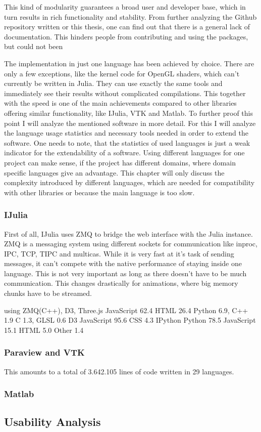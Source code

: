 This kind of modularity guarantees a broad user and developer base, which in turn results in rich functionality and stability.
From further analyzing the Github repository written or this thesis, one can find out that there is a general lack of documentation.
This hinders people from contributing and using the packages, but could not been 

The implementation in just one language has been achieved by choice. There are only a few exceptions, like the kernel code for OpenGL shaders, which can't currently be written in Julia. 
They can use exactly the same tools and immediately see their results without complicated compilations.
This together with the speed is one of the main achievements compared to other libraries offering similar functionality, like IJulia, VTK and Matlab.
To further proof this point I will analyze the mentioned software in more detail.
For this I will analyze the language usage statistics and necessary tools needed in order to extend the software.
One needs to note, that the statistics of used languages is just a weak indicator for the extendability of a software.
Using different languages for one project can make sense, if the project has different domains, where domain specific languages give an advantage.
This chapter will only discuss the complexity introduced by different languages, which are needed for compatibility with other libraries or because the main language is too slow.

\subsubsection{IJulia}
First of all, IJulia uses ZMQ to bridge the web interface with the Julia instance.
ZMQ is a messaging system using different sockets for communication like inproc, IPC, TCP, TIPC and multicas.
While it is very fast at it's task of sending messages, it can't compete with the native performance of staying inside one language.
This is not very important as long as there doesn't have to be much communication. This changes drastically for animations, where big memory chunks have to be streamed.

using ZMQ(C++), D3, 
Three.js
JavaScript 62.4	 HTML 26.4	 Python 6.9,	 C++ 1.9	 C 1.3,	 GLSL 0.6
D3
JavaScript 95.6	 CSS 4.3
IPython
Python 78.5	 JavaScript 15.1	 HTML 5.0	 Other 1.4

\subsubsection{Paraview and VTK}



This amounts to a total of 3.642.105 lines of code written in 29 languages.

\subsubsection{Matlab}



\subsection{Usability Analysis}

